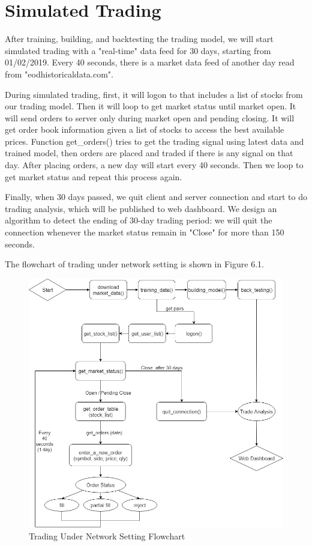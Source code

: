 \chapter{Simulated Trading}
\label{chap:simulated trading}


After training, building, and backtesting the trading model, we will start simulated trading with a "real-time" data feed for 30 days, starting from 01/02/2019. Every 40 seconds, there is a market data feed of another day read from "eodhistoricaldata.com". 

During simulated trading, first, it will logon to that includes a list of stocks from our trading model. Then it will loop to get market status until market open. It will send orders to server only during market open and pending closing. It will get order book information given a list of stocks to access the best available prices. Function get\_orders() tries to get the trading signal using latest data and trained model, then orders are placed and traded if there is any signal on that day. After placing orders, a new day will start every 40 seconds. Then we loop to get market status and repeat this process again.

Finally, when 30 days passed, we quit client and server connection and start to do trading analysis, which will be published to web dashboard. We design an algorithm to detect the ending of 30-day trading period: we will quit the connection whenever the market status remain in "Close" for more than 150 seconds. 

The flowchart of trading under network setting is shown in Figure 6.1.

\begin{figure}[h!]
\centering
\includegraphics[scale=0.5]{simulated_trading/images/trading.jpg}
\caption{Trading Under Network Setting Flowchart}
\label{fig:trading}
\end{figure}